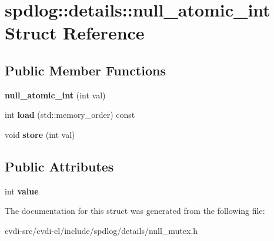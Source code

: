 \hypertarget{structspdlog_1_1details_1_1null__atomic__int}{}\section{spdlog\+:\+:details\+:\+:null\+\_\+atomic\+\_\+int Struct Reference}
\label{structspdlog_1_1details_1_1null__atomic__int}
\subsection*{Public Member Functions}
\begin{DoxyCompactItemize}
\item 
{\bfseries null\+\_\+atomic\+\_\+int} (int val)\hypertarget{structspdlog_1_1details_1_1null__atomic__int_aa9856518fa8bc88f466b2b9c17bff1b9}{}\label{structspdlog_1_1details_1_1null__atomic__int_aa9856518fa8bc88f466b2b9c17bff1b9}

\item 
int {\bfseries load} (std\+::memory\+\_\+order) const \hypertarget{structspdlog_1_1details_1_1null__atomic__int_a9ddf324260ae269cf124e6158a6a4188}{}\label{structspdlog_1_1details_1_1null__atomic__int_a9ddf324260ae269cf124e6158a6a4188}

\item 
void {\bfseries store} (int val)\hypertarget{structspdlog_1_1details_1_1null__atomic__int_a75c74956220ca5cc82a4eedcd9aa854f}{}\label{structspdlog_1_1details_1_1null__atomic__int_a75c74956220ca5cc82a4eedcd9aa854f}

\end{DoxyCompactItemize}
\subsection*{Public Attributes}
\begin{DoxyCompactItemize}
\item 
int {\bfseries value}\hypertarget{structspdlog_1_1details_1_1null__atomic__int_ab433069a53cdd1402dc7b0b942d7095f}{}\label{structspdlog_1_1details_1_1null__atomic__int_ab433069a53cdd1402dc7b0b942d7095f}

\end{DoxyCompactItemize}


The documentation for this struct was generated from the following file\+:\begin{DoxyCompactItemize}
\item 
cvdi-\/src/cvdi-\/cl/include/spdlog/details/null\+\_\+mutex.\+h\end{DoxyCompactItemize}
